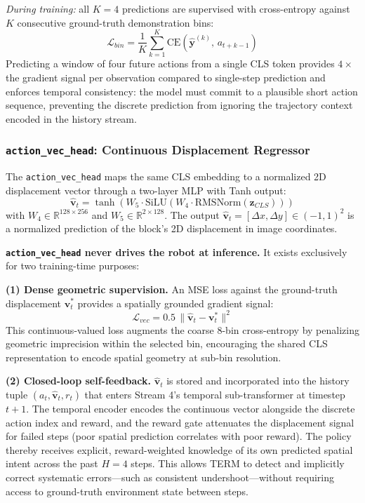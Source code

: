 \documentclass[letterpaper]{article} %
\begin{document}
\textit{During training:} all $K{=}4$ predictions are supervised with cross-entropy against $K$ consecutive ground-truth demonstration bins:
\begin{equation}
\mathcal{L}_{bin} = \frac{1}{K} \sum_{k=1}^{K} \mathrm{CE}\!\left(\hat{\mathbf{y}}^{(k)},\, a_{t+k-1}\right)
\end{equation}
Predicting a window of four future actions from a single CLS token provides $4{\times}$ the gradient signal per observation compared to single-step prediction and enforces temporal consistency: the model must commit to a plausible short action sequence, preventing the discrete prediction from ignoring the trajectory context encoded in the history stream.

\subsubsection{\texttt{action\_vec\_head}: Continuous Displacement Regressor}

The \texttt{action\_vec\_head} maps the same CLS embedding to a normalized 2D displacement vector through a two-layer MLP with Tanh output:
\begin{equation}
\hat{\mathbf{v}}_t = \tanh\!\left(W_5 \cdot \mathrm{SiLU}\!\left(W_4 \cdot \mathrm{RMSNorm}(\mathbf{z}_{CLS})\right)\right)
\end{equation}
with $W_4 \in \mathbb{R}^{128 \times 256}$ and $W_5 \in \mathbb{R}^{2 \times 128}$. The output $\hat{\mathbf{v}}_t = [\Delta x, \Delta y] \in (-1,1)^2$ is a normalized prediction of the block's 2D displacement in image coordinates.

\textbf{\texttt{action\_vec\_head} never drives the robot at inference.} It exists exclusively for two training-time purposes:

\textbf{(1) Dense geometric supervision.} An MSE loss against the ground-truth displacement $\mathbf{v}^*_t$ provides a spatially grounded gradient signal:
\begin{equation}
\mathcal{L}_{vec} = 0.5\,\|\hat{\mathbf{v}}_t - \mathbf{v}^*_t\|^2
\end{equation}
This continuous-valued loss augments the coarse 8-bin cross-entropy by penalizing geometric imprecision within the selected bin, encouraging the shared CLS representation to encode spatial geometry at sub-bin resolution.

\textbf{(2) Closed-loop self-feedback.} $\hat{\mathbf{v}}_t$ is stored and incorporated into the history tuple $(a_t, \hat{\mathbf{v}}_t, r_t)$ that enters Stream 4's temporal sub-transformer at timestep $t{+}1$. The temporal encoder encodes the continuous vector alongside the discrete action index and reward, and the reward gate attenuates the displacement signal for failed steps (poor spatial prediction correlates with poor reward). The policy thereby receives explicit, reward-weighted knowledge of its own predicted spatial intent across the past $H{=}4$ steps. This allows TERM to detect and implicitly correct systematic errors---such as consistent undershoot---without requiring access to ground-truth environment state between steps.
\end{document}
